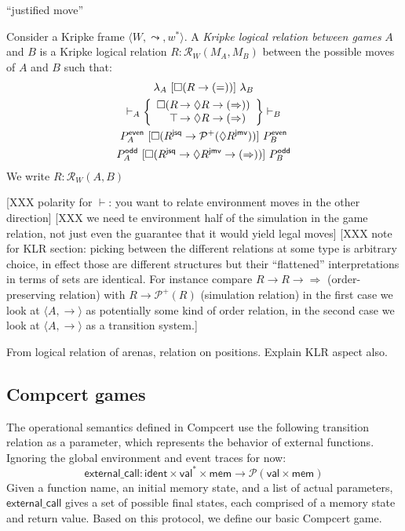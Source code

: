\documentclass[acmsmall,anonymous]{acmart}
\newcommand{\kw}[1]{\ensuremath{ \textsf{#1} }}
\newcommand{\ifr}[1]{\ [{#1}]\ }
\begin{document}
``justified move''

Consider a Kripke frame $\langle W, \leadsto, w^* \rangle$.
A \emph{Kripke logical relation between games} $A$ and $B$
is a Kripke logical relation $R : \mathcal{R}_W(M_A, M_B)$
between the possible moves of $A$ and $B$
such that:
\begin{gather*}
  \lambda_A \ifr{\Box (R \rightarrow (=))} \lambda_B \\
  \vdash_A
      \left\{
      \begin{array}{r@{\,}l}
        \Box(R &\rightarrow \Diamond R \rightarrow (\Rightarrow)) \\
          \top &\rightarrow \Diamond R \rightarrow (\Rightarrow)
      \end{array}
      \right\}
    \vdash_B \\
  P_A^\kw{even}
    \ifr{\Box (R^\kw{jsq} \rightarrow \mathcal{P}^+(\Diamond R^\kw{jmv}))}
      P_B^\kw{even} \\
  P_A^\kw{odd}
    \ifr{\Box (R^\kw{jsq} \rightarrow \Diamond R^\kw{jmv} \rightarrow (\Rightarrow))}
      P_B^\kw{odd}
\end{gather*}
We write $R : \mathcal{R}_W(A, B)$

[XXX polarity for $\vdash$: you want to relate environment moves
in the other direction]
[XXX we need te environment half of the simulation
in the game relation, not just even the guarantee that it would yield
legal moves]
[XXX note for KLR section: picking between
the different relations at some type is arbitrary choice,
in effect those are different structures
but their ``flattened'' interpretations in terms of sets are identical.
For instance compare $R \rightarrow R \rightarrow \Rightarrow$
(order-preserving relation)
with $R \rightarrow \mathcal{P}^+(R)$
(simulation relation)
in the first case we look at $\langle A, \rightarrow \rangle$
as potentially some kind of order relation,
in the second case we look at $\langle A, \rightarrow \rangle$
as a transition system.]

From logical relation of arenas, relation on positions.
Explain KLR aspect also.


\subsection{Compcert games} %

The operational semantics defined in Compcert
use the following transition relation as a parameter,
which represents the behavior of external functions.
Ignoring the global environment and event traces for now:
\[
  \kw{external\_call} :
    \kw{ident} \times \kw{val}^* \times \kw{mem} \rightarrow
    \mathcal{P}(\kw{val} \times \kw{mem})
\]
Given a function name,
an initial memory state,
and a list of actual parameters,
$\kw{external\_call}$ gives a set of possible final states,
each comprised of a memory state and return value.
Based on this protocol,
we define our basic Compcert game.
\end{document}
